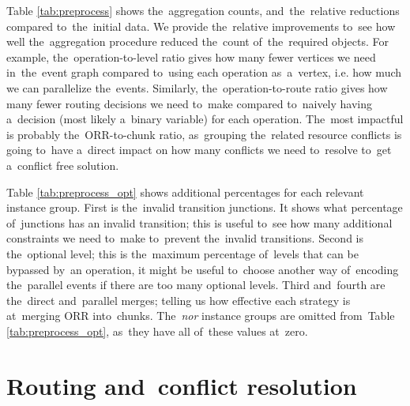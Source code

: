 Table \ref{tab:preprocess} shows the~aggregation counts, and~the~relative reductions compared to~the~initial data. We provide the~relative improvements to~see how well the~aggregation procedure reduced the~count of~the~required objects. For example, the~operation-to-level ratio gives how many fewer vertices we need in~the~event graph compared to~using each operation as~a~vertex, i.e. how much we can parallelize the~events. Similarly, the~operation-to-route ratio gives how many fewer routing decisions we need to~make compared to~naively having a~decision (most likely a~binary variable) for each operation. The~most impactful is probably the~ORR-to-chunk ratio, as~grouping the~related resource conflicts is going to~have a~direct impact on how many conflicts we need to~resolve to~get a~conflict free solution.

\begin{table}[htbp!]
\begin{center}
\caption{Aggregation counts and~relative reductions}
\label{tab:preprocess}

\end{center}
\end{table}

Table \ref{tab:preprocess_opt} shows additional percentages for each relevant instance group. First is the~invalid transition junctions. It shows what percentage of~junctions has an invalid transition; this is useful to~see how many additional constraints we need to~make to~prevent the~invalid transitions. Second is the~optional level; this is the~maximum percentage of~levels that can be bypassed by~an operation, it might be useful to~choose another way of~encoding the~parallel events if there are too many optional levels. Third and~fourth are the~direct and~parallel merges; telling us how effective each strategy is at~merging ORR into~chunks. The~\emph{nor} instance groups are omitted from~Table \ref{tab:preprocess_opt}, as~they have all of~these values at~zero.

\begin{table}[htbp!]
\begin{center}
\caption{Aggregation - additional data}
\label{tab:preprocess_opt}

\end{center}
\end{table}

\section{Routing and~conflict resolution}

